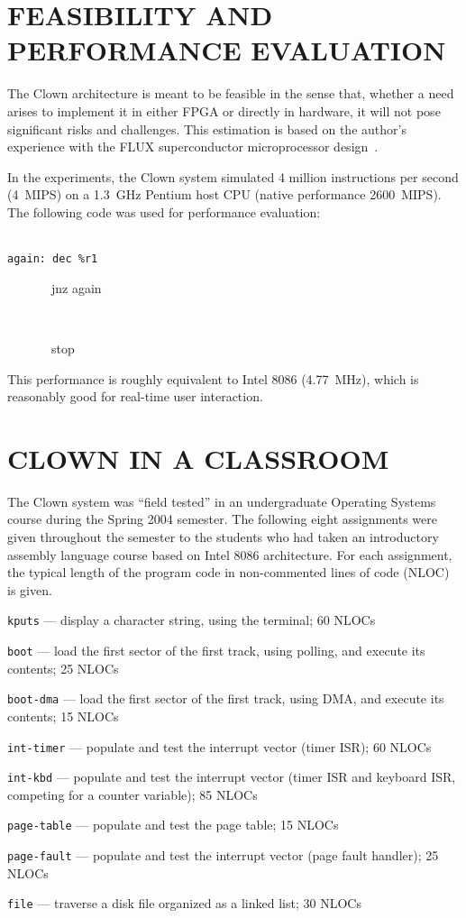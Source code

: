 \documentclass[10pt,twoside]{article}
\newenvironment{mylist}{\begin{list}{}{\setlength\itemsep{0\baselineskip}}}{\end{list}}
\begin{document}
\section{FEASIBILITY AND PERFORMANCE EVALUATION}
The Clown architecture is meant to be feasible in the sense that,
whether a need arises to implement it in either FPGA or directly in
hardware, it will not pose significant risks and challenges. This
estimation is based on the author's experience with the FLUX
superconductor microprocessor design~\cite{zinoviev00}.

In the experiments, the Clown system simulated 4 million instructions
per second (4~MIPS) on a 1.3~GHz Pentium host CPU (native performance
2600~MIPS). The following code was used for performance evaluation:

\baselineskip
{}\\
{\tt again:\ dec \%r1}\\
{\tt\strut\ \ \ \ \ \ \ jnz again}\\
{\tt\strut\ \ \ \ \ \ \ stop}
\baselineskip

This performance is roughly equivalent to Intel 8086 (4.77~MHz), which
is reasonably good for real-time user interaction.

\section{CLOWN IN A CLASSROOM}

The Clown system was ``field tested'' in an undergraduate Operating
Systems course during the Spring 2004 semester. The following eight
assignments were given throughout the semester to the students who had
taken an introductory assembly language course based on Intel 8086
architecture. For each assignment, the typical length of the program
code in non-commented lines of code (NLOC) is given.

\begin{mylist}
\item {\tt kputs} --- display a character string, using the terminal;
60 NLOCs \item {\tt boot} --- load the first sector of the first track, using
  polling, and execute its contents; 25 NLOCs \item {\tt boot-dma} --- load the first sector of the first track,
  using DMA,  and execute its contents; 15 NLOCs \item {\tt int-timer} --- populate and test the interrupt vector (timer
  ISR); 60 NLOCs \item {\tt int-kbd} --- populate and test the interrupt vector
  (timer ISR and keyboard ISR, competing for a counter variable); 85 NLOCs \item {\tt page-table} --- populate and test the page table; 15 NLOCs \item {\tt page-fault} --- populate and test the interrupt vector
  (page fault handler); 25 NLOCs  \item {\tt file} --- traverse a disk file organized as a linked list;
  30 NLOCs \end{mylist}
\end{document}

